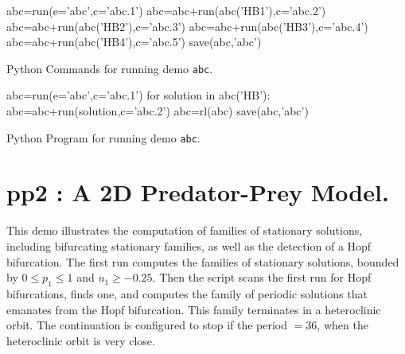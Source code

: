 \documentclass[12pt]{report}
\begin{document}
\begin{table}[htbp]
{\small 
\begin{center} 
\begin{boxedverbatim}
abc=run(e='abc',c='abc.1')
abc=abc+run(abc('HB1'),c='abc.2')
abc=abc+run(abc('HB2'),c='abc.3')
abc=abc+run(abc('HB3'),c='abc.4')
abc=abc+run(abc('HB4'),c='abc.5')
save(abc,'abc')
\end{boxedverbatim}
\end{center}
}
\caption{Python Commands for running demo {\tt abc}.}
\label{tbl:demo_abcP1}
\end{table}

\begin{table}[htbp]
{\small
\begin{center}
\begin{boxedverbatim}
abc=run(e='abc',c='abc.1')
for solution in abc('HB'):
    abc=abc+run(solution,c='abc.2')
abc=rl(abc)
save(abc,'abc')
\end{boxedverbatim}
\end{center}
}
\caption{Python Program for running demo {\tt abc}.}
\label{tbl:demo_abcP2}
\end{table}


\newpage
\section{ pp2 : A 2D Predator-Prey Model.} \label{sec:Demos_pp2}
This demo illustrates the computation of families of stationary
solutions, including bifurcating stationary families, as well as
the detection of a Hopf bifurcation.
The first run computes the families of stationary solutions, bounded
by $0\le p_1\le 1$ and $u_1 \ge -0.25$. Then the script 
scans the first run for Hopf bifurcations, finds one, and computes
the family of periodic solutions that emanates
from the Hopf bifurcation. This family terminates in
a heteroclinic orbit. The continuation is configured to stop if the period
$=36$, when the heteroclinic orbit is very close.
\end{document}
